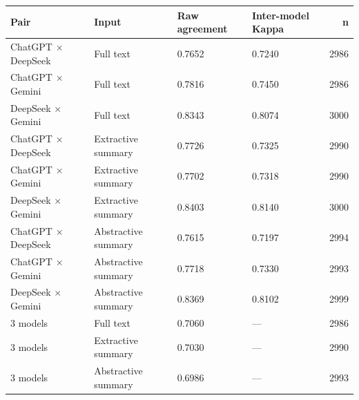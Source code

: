 \begin{tabular}{llllr}
\toprule
Pair & Input & Raw agreement & Inter-model Kappa & n \\
\midrule
ChatGPT × DeepSeek & Full text & 0.7652 & 0.7240 & 2986 \\
ChatGPT × Gemini & Full text & 0.7816 & 0.7450 & 2986 \\
DeepSeek × Gemini & Full text & 0.8343 & 0.8074 & 3000 \\
ChatGPT × DeepSeek & Extractive summary & 0.7726 & 0.7325 & 2990 \\
ChatGPT × Gemini & Extractive summary & 0.7702 & 0.7318 & 2990 \\
DeepSeek × Gemini & Extractive summary & 0.8403 & 0.8140 & 3000 \\
ChatGPT × DeepSeek & Abstractive summary & 0.7615 & 0.7197 & 2994 \\
ChatGPT × Gemini & Abstractive summary & 0.7718 & 0.7330 & 2993 \\
DeepSeek × Gemini & Abstractive summary & 0.8369 & 0.8102 & 2999 \\
3 models & Full text & 0.7060 & — & 2986 \\
3 models & Extractive summary & 0.7030 & — & 2990 \\
3 models & Abstractive summary & 0.6986 & — & 2993 \\
\bottomrule
\end{tabular}
